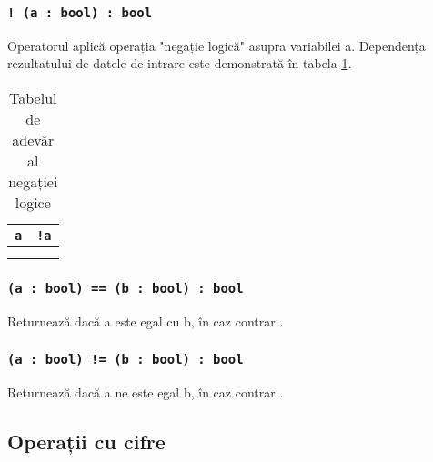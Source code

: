 \subsubsection{\texttt{! (a : bool) : bool}}

Operatorul aplică operația "negație logică" asupra variabilei a. Dependența rezultatului de datele de intrare este demonstrată în tabela  \ref{invtable}.

\begin{table}[htb]
	\caption{Tabelul de adevăr al negației logice}
	\label{invtable}
	\begin{tabular}{|c|c|}
		\hline
		\texttt{a} & \texttt{!a} \\ \hline
		\false{} &  \true{}  \\ \hline
		\true{}  & \false{}  \\ \hline
	\end{tabular}
	\vspace{-2em}
\end{table}

\subsubsection{\texttt{(a : bool) == (b : bool) : bool}}

Returnează \true{} dacă a este egal cu b, în caz contrar \false{}.

\subsubsection{\texttt{(a : bool) != (b : bool) : bool}}

Returnează \true{} dacă a ne este egal b, în caz contrar \false{}.

\subsection{Operații cu cifre}

